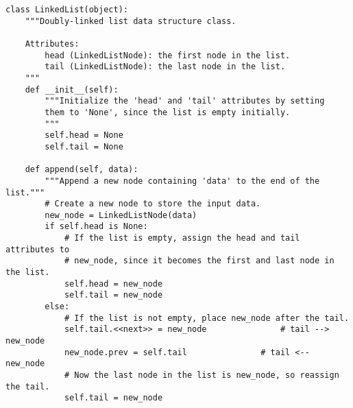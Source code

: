 \begin{lstlisting}
class LinkedList(object):
    """Doubly-linked list data structure class.

    Attributes:
        head (LinkedListNode): the first node in the list.
        tail (LinkedListNode): the last node in the list.
    """
    def __init__(self):
        """Initialize the 'head' and 'tail' attributes by setting
        them to 'None', since the list is empty initially.
        """
        self.head = None
        self.tail = None

    def append(self, data):
        """Append a new node containing 'data' to the end of the list."""
        # Create a new node to store the input data.
        new_node = LinkedListNode(data)
        if self.head is None:
            # If the list is empty, assign the head and tail attributes to
            # new_node, since it becomes the first and last node in the list.
            self.head = new_node
            self.tail = new_node
        else:
            # If the list is not empty, place new_node after the tail.
            self.tail.<<next>> = new_node               # tail --> new_node
            new_node.prev = self.tail               # tail <-- new_node
            # Now the last node in the list is new_node, so reassign the tail.
            self.tail = new_node
\end{lstlisting}

